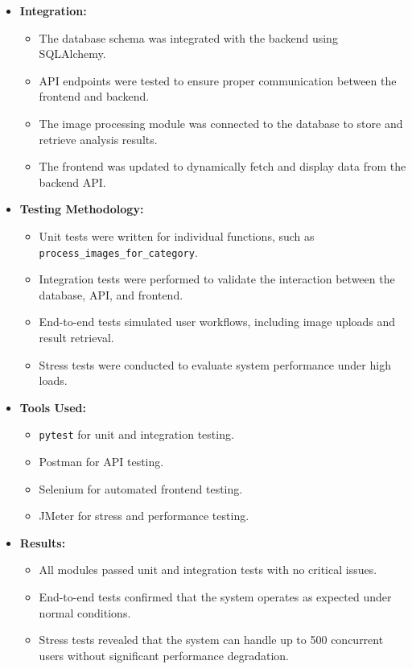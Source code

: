 \begin{itemize}
    \item \textbf{Integration:} 
    \begin{itemize}
        \item The database schema was integrated with the backend using SQLAlchemy.
        \item API endpoints were tested to ensure proper communication between the frontend and backend.
        \item The image processing module was connected to the database to store and retrieve analysis results.
        \item The frontend was updated to dynamically fetch and display data from the backend API.
    \end{itemize}
    \item \textbf{Testing Methodology:}
    \begin{itemize}
        \item Unit tests were written for individual functions, such as \texttt{process\_images\_for\_category}.
        \item Integration tests were performed to validate the interaction between the database, API, and frontend.
        \item End-to-end tests simulated user workflows, including image uploads and result retrieval.
        \item Stress tests were conducted to evaluate system performance under high loads.
    \end{itemize}
    \item \textbf{Tools Used:}
    \begin{itemize}
        \item \texttt{pytest} for unit and integration testing.
        \item Postman for API testing.
        \item Selenium for automated frontend testing.
        \item JMeter for stress and performance testing.
    \end{itemize}
    \item \textbf{Results:}
    \begin{itemize}
        \item All modules passed unit and integration tests with no critical issues.
        \item End-to-end tests confirmed that the system operates as expected under normal conditions.
        \item Stress tests revealed that the system can handle up to 500 concurrent users without significant performance degradation.

\end{itemize}
\end{itemize}

